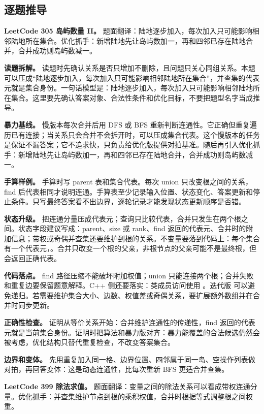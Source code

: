 \subsection{逐题推导}

\noindent\textbf{LeetCode 305 岛屿数量 II。} 题面翻译：陆地逐步加入，每次加入只可能影响相邻陆地所在集合。优化抓手：新增陆地先让岛屿数加一，再和四邻已存在陆地合并，合并成功则岛屿数减一。

\textbf{读题拆解。} 读题时先确认关系是否只增加不删除，且问题只关心同组关系。本题可以压成“陆地逐步加入，每次加入只可能影响相邻陆地所在集合”，并查集的代表元就是集合身份。一句话模型是：陆地逐步加入，每次加入只可能影响相邻陆地所在集合。这里要先确认答案对象、合法性条件和优化目标，不要把题型名字当成推导。

\textbf{暴力基线。} 慢版本每次合并后用 DFS 或 BFS 重新判断连通性。它正确但重复遍历已有连接；当关系只会合并不会拆开时，可以压成集合代表。这个慢版本的任务是保证不漏答案；它不追求快，只负责给优化版提供对拍基准。随后再引入优化抓手：新增陆地先让岛屿数加一，再和四邻已存在陆地合并，合并成功则岛屿数减一。

\textbf{手算样例。} 手算时写 parent 表和集合代表。每次 union 只改变根之间的关系，find 后代表相同才说明连通。手算表至少记录输入位置、状态变化、答案更新和停止条件。只写最终答案看不出边界，逐轮记录才能发现状态更新顺序是否错。

\textbf{状态升级。} 把连通分量压成代表元；查询只比较代表，合并只发生在两个根之间。状态字段建议写成：parent、size 或 rank、find 返回的代表元、合并时的附加信息；带权或奇偶并查集还要维护到根的关系。不变量要落到代码上：每个集合有一个代表元，。合并只改变一个根的父亲，非根节点的父亲可能不是最终根，但  会返回正确代表。

\textbf{代码落点。} find 路径压缩不能破坏附加权值；union 只能连接两个根；合并失败和重复边要保留题意解释。C++ 侧还要落实：类成员访问使用 。迭代版  可以避免递归。若需要维护集合大小、边数、权值差或奇偶关系，要扩展额外数组并在合并时同步更新。

\textbf{正确性检查。} 证明从等价关系开始：合并维护连通性的传递性，find 返回的代表元就是当前集合身份。证明时把算法和暴力版对齐：暴力能覆盖的合法候选仍然会被考虑，优化结构只替代重复检查，不改变答案集合。

\textbf{边界和变体。} 先用重复加入同一格、边界位置、四邻属于同一岛、空操作列表做对拍，再回答变体：这是动态连通性，比每次重新 BFS 更适合并查集。

\noindent\textbf{LeetCode 399 除法求值。} 题面翻译：变量之间的除法关系可以看成带权连通分量。优化抓手：并查集维护节点到根的乘积权值，合并时根据等式调整根之间权重。

